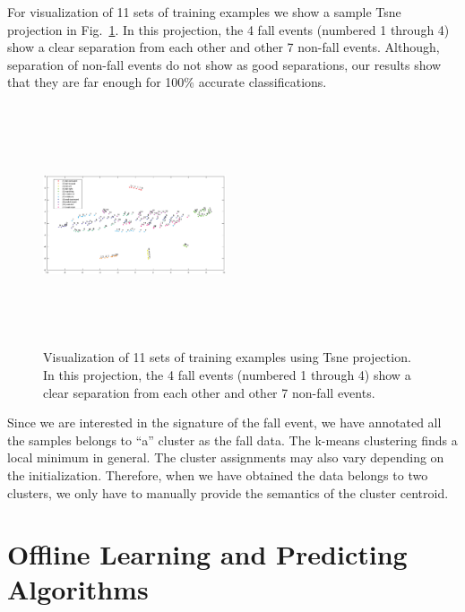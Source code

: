 \documentclass{IEEEtran}
\begin{document}
\par
For visualization of 11 sets of training examples we show a sample Tsne projection in Fig.~\ref{fig:automatic_annotation3}. In this projection, the 4 fall events (numbered 1 through 4) show a clear separation from each other and other 7 non-fall events. Although, separation of non-fall events do not show as good separations, our results show that they are far enough for 100\% accurate classifications.

\begin{figure}[!htb]
\centering
\includegraphics[width=0.48\textwidth, height=2.8in]{figures/viz_all_training_examples_corp.eps} 
\caption{Visualization of 11 sets of training examples using Tsne projection. In this projection, the 4 fall events (numbered 1 through 4) show a clear separation from each other and other 7 non-fall events.}
 \label{fig:automatic_annotation3} 
\end{figure}


Since we are 
interested in the signature of the fall event, we have annotated all the samples belongs 
to ``a'' cluster as the fall data. The k-means clustering finds a 
local minimum in general. The cluster assignments may also vary depending on the 
initialization. Therefore, when we have obtained the data belongs to two clusters, we 
only have to manually provide the semantics of the cluster centroid. 

\section{Offline Learning and Predicting Algorithms}
\label{sec:OffLineLearning}

\end{document}
